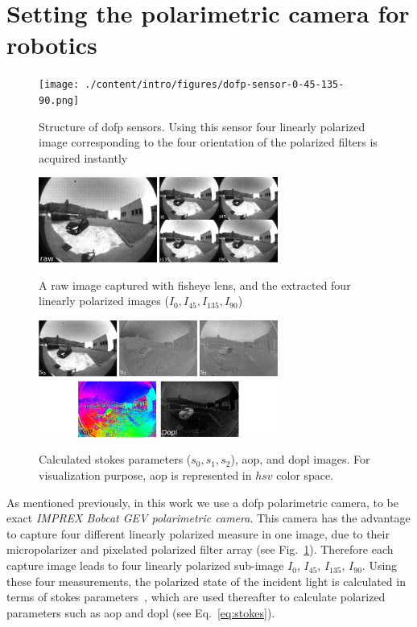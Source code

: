 \graphicspath{{./content/intro/figures/}}

\section{Setting the polarimetric camera for robotics}
\label{sec:rosify}

\begin{figure}
  \centering
  \texttt{[image: ./content/intro/figures/dofp-sensor-0-45-135-90.png]}
  \label{fig:dofp-sensor}
  \caption{Structure of \gls{dofp} sensors. Using this sensor four linearly
    polarized image corresponding to the four orientation of the polarized
    filters is acquired instantly}
\end{figure}

\begin{figure}
  \centering
  \includegraphics[width=0.7\textwidth]{./content/intro/figures/raw-sp.png}
  \label{fig:raw-sp}
  \caption{A raw image captured with fisheye lens, and the extracted four
    linearly polarized images ($I_0, I_{45}, I_{135}, I_{90}$)}
\end{figure}

\begin{figure}
  \centering
  \includegraphics[width=0.7\textwidth]{./content/intro/figures/stokes_aop_dop.png}
  \label{fig:stokes-aop-dop}
  \caption{Calculated stokes parameters ($s_0, s_1, s_2$), \gls{aop}, and
    \gls{dopl} images. For visualization purpose, \gls{aop} is represented in
    $hsv$ color space.}
\end{figure}


As mentioned previously, in this work we use a \gls{dofp} polarimetric camera,
to be exact \textit{IMPREX Bobcat GEV polarimetric camera}.
This camera has the advantage to capture four different linearly polarized
measure in one image, due to their micropolarizer and pixelated polarized
filter array (see Fig.~\ref{fig:dofp-sensor}).
Therefore each capture image leads to four linearly polarized sub-image $I_0$,
$I_{45}$, $I_{135}$, $I_{90}$.
Using these four measurements, the polarized state of the incident light is
calculated in terms of stokes parameters~\cite{goldstein2017polarized}, which
are used thereafter to calculate polarized parameters such as \gls{aop} and
\gls{dopl} (see Eq.~\ref{eq:stokes}).



